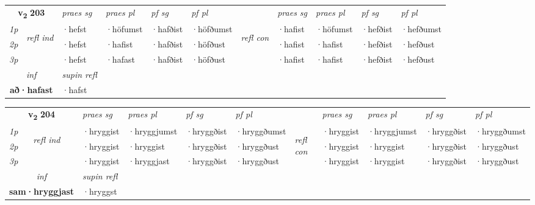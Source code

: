 \noindent
\begin{tabular}{lllllllllll} \toprule
\multicolumn{2}{c}{\textbf{v{\textsubscript{2}}} \Large{\textbf{203}}}  &  \textit{praes sg}  & \textit{praes pl}  &\textit{ pf sg} & \textit{pf pl} &  &  \textit{praes sg}  & \textit{praes pl}  & \textit{pf sg} & \textit{pf pl } \\*
	\cmidrule{3-6} \cmidrule{8-11}
 {\textit{1p}} & \multirow{3}{*}{\begin{turn}{90}\textit{refl ind}\end{turn}}  & ·hefst & ·höfumst & ·hafðist & ·höfðumst & \multirow{3}{*}{\begin{turn}{90}\textit{refl con}\end{turn}}  &·hafist & ·höfumst & ·hefðist & ·hefðumst \\*
 {\textit{2p}} &  & ·hefst & ·hafist & ·hafðist & ·höfðust & &·hafist & ·hafist & ·hefðist & ·hefðust \\*
 {\textit{3p}}  & & ·hefst & ·hafast & ·hafðist & ·höfðust & & ·hafist & ·hafist& ·hefðist & ·hefðust \\*
\cmidrule{3-6} \cmidrule{8-11}

   \multicolumn{2}{c}{\textit{inf}}       & \textit{supin refl}  \\*
  \multicolumn{2}{c}{\textbf{að\allowbreak ·hafast}}        & ·hafst  \\*
\end{tabular}

\noindent
\begin{tabular}{lllllllllll} \toprule
\multicolumn{2}{c}{\textbf{v{\textsubscript{2}}} \Large{\textbf{204}}}  &  \textit{praes sg}  & \textit{praes pl}  &\textit{ pf sg} & \textit{pf pl} &  &  \textit{praes sg}  & \textit{praes pl}  & \textit{pf sg} & \textit{pf pl } \\*
	\cmidrule{3-6} \cmidrule{8-11}
 {\textit{1p}} & \multirow{3}{*}{\begin{turn}{90}\textit{refl ind}\end{turn}}  & ·hryggist & ·hryggjumst & ·hryggðist & ·hryggðumst & \multirow{3}{*}{\begin{turn}{90}\textit{refl con}\end{turn}}  &·hryggist & ·hryggjumst & ·hryggðist & ·hryggðumst \\*
 {\textit{2p}} &  & ·hryggist & ·hryggist & ·hryggðist & ·hryggðust & &·hryggist & ·hryggist & ·hryggðist & ·hryggðust \\*
 {\textit{3p}}  & & ·hryggist & ·hryggjast & ·hryggðist & ·hryggðust & & ·hryggist & ·hryggist& ·hryggðist & ·hryggðust \\*
\cmidrule{3-6} \cmidrule{8-11}

   \multicolumn{2}{c}{\textit{inf}}       & \textit{supin refl}  \\*
  \multicolumn{2}{c}{\textbf{sam\allowbreak ·hryggjast}}        & ·hryggst  \\*
\end{tabular}

